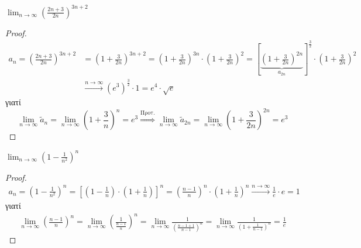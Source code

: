 \begin{enumerate}[i)]
        \item $ \lim_{n \to \infty} \left(\frac{2n+3}{2n} \right)^{3n+2} $
          \begin{proof}
          \item {}
            \begin{align*}
              a_{n}= \left(\frac{2n+3}{2n} \right)^{3n+2} 
            &= \left(1+ \frac{3}{2n} \right)^{3n+2} = 
            \left(1+ \frac{3}{2n} \right)^{3n} \cdot \left(1+ 
              \frac{3}{2n} \right)^{2} = \left[\underbrace{\left(1+
            \frac{3}{2n}\right)^{2n}}_{a_{2n}}\right]^{\frac{3}{2}} 
            \cdot \left(1+ \frac{3}{2n} \right)^{2} \\ 
            &\xrightarrow{n \to \infty} (e^{3})^{\frac{3}{2}} \cdot 1  = 
            e^{4}\cdot \sqrt{e} 
            \end{align*} 
            γιατί 
            \[
              \lim_{n \to \infty} \tilde{a} _{n} = \lim_{n \to \infty} 
              \left(1+ \frac{3}{n} \right)^{n} = e^{3} 
              \overset{\text{Προτ.}}{\Rightarrow } \lim_{n \to \infty} 
              \tilde{a} _{2n} = \lim_{n \to \infty} \left(1+ \frac{3}{2n} 
              \right)^{2n} = e^{3}
            \]
          \end{proof}

        \item $ \lim_{n \to \infty} \left(1- \frac{1}{n^{2}}\right)^{n} $
          \begin{proof}
            \begin{align*}
              a_{n}=\left(1- \frac{1}{n^{2}} \right)^{n} = 
              \left[\left(1- \frac{1}{n} \right) \cdot
                \left(1+ \frac{1}{n} \right)\right]^{n} = \left(\frac{n-1}{n} 
              \right)^{n} \cdot 
              \left(1+ \frac{1}{n} \right)^{n} \xrightarrow{n \to \infty}  
              \frac{1}{e} \cdot e = 1
            \end{align*} 
            γιατί 
            \begin{align*}
              \lim_{n \to \infty} \left(\frac{n-1}{n} \right)^{n} = 
              \lim_{n \to \infty} \left(\frac{1}{\frac{n-1}{n}}\right)^{n} = 
              \lim_{n \to \infty} \frac{1}{\left(\frac{n-1+1}{n-1}\right)^{n}} = 
              \lim_{n \to \infty} \frac{1}{\left(1+ \frac{1}{n-1} \right)^{n}} =
              \frac{1}{e} 
            \end{align*}
          \end{proof}


\end{enumerate}
